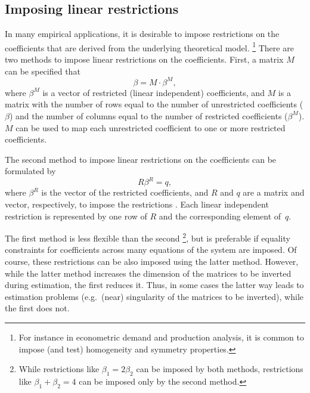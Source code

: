 \subsection{Imposing linear restrictions}\label{sec:Restrictions}

In many empirical applications,
it is desirable to impose restrictions on the coefficients
that are derived from the underlying theoretical model.%
\footnote{%
For instance in econometric demand and production analysis,
it is common to impose (and test) homogeneity and symmetry properties.
}
There are two methods to impose linear restrictions on the coefficients.
First, a matrix $M$ can be specified that
\begin{equation}
   \beta = M \cdot \beta^M \label{eq:T-restr} ,
\end{equation}
where $\beta^M$ is a vector of restricted (linear independent) coefficients,
and $M$ is a matrix with the number of rows equal to the number of
unrestricted coefficients ($\beta$) and
the number of columns equal to the number of restricted coefficients
($\beta^M$).
$M$ can be used to map each unrestricted coefficient to one or more
restricted coefficients.

The second method to impose linear restrictions on the coefficients
can be formulated by
\begin{equation}
   R \beta^R = q ,
   \label{eq:restr-R}
\end{equation}
where $\beta^R$ is the vector of the restricted coefficients,
and $R$ and $q$ are a matrix and vector, respectively,
to impose the restrictions \citep[see][p.\ 100]{greene03}.
Each linear independent restriction is represented by one row of $R$
and the corresponding element of~$q$.

The first method is less flexible than the second%
\footnote{
While restrictions like $\beta_1 = 2 \beta_2$ can be imposed by
both methods,
restrictions like $\beta_1 + \beta_2 = 4$ can be imposed only
by the second method.
}, 
but is preferable if equality constraints for coefficients
across many equations of the system are imposed. 
Of course, these restrictions can be also imposed using
the latter method.
However, while the latter method increases the dimension of the 
matrices to be inverted during estimation, the first reduces it. 
Thus, in some cases the latter way leads to estimation problems
(e.g.\ (near) singularity of the matrices to be inverted),
while the first does not.

